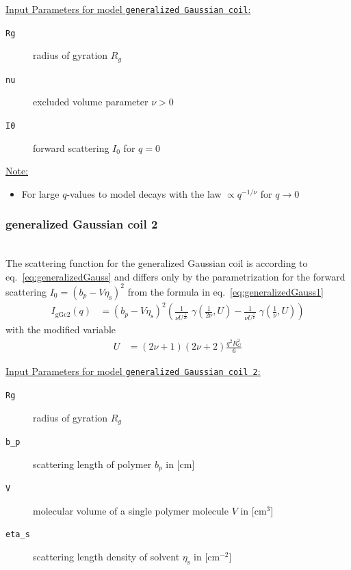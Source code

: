 \vspace{5mm}
\noindent \uline{Input Parameters for model \texttt{generalized Gaussian coil}:}
\begin{description}
\item[\texttt{Rg}] radius of gyration $R_g$
\item[\texttt{nu}] excluded volume parameter $\nu>0$
\item[\texttt{I0}] forward scattering $I_0$ for $q=0$
\end{description}
\vspace{5mm}

\noindent \uline{Note:}
\begin{itemize}
\item For large $q$-values to model decays with the law $\propto q^{-1/\nu}$ for $q \rightarrow 0$
\end{itemize}
\vspace{5mm}

\subsubsection{generalized Gaussian coil 2} \cite{Hammouda,Hammouda2012}
\label{sect:generalized_gaussian_coil2}
~\\
The scattering function for the generalized Gaussian coil is according to eq.\ \ref{eq:generalizedGauss}
and differs only by the parametrization for the forward scattering
$I_0=(b_p-V\eta_\text{s})^2$ from the formula in eq.\ \ref{eq:generalizedGauss1}
\begin{align}
I_\text{gGc2}(q) &= \left(b_p-V\eta_\text{s}\right)^2
\left(
\frac{1}{\nu U^{\frac{1}{2 \nu}}} \; \gamma\left(\frac{1}{2 \nu},U\right)-
\frac{1}{\nu U^{\frac{1}{  \nu}}} \; \gamma\left(\frac{1}{  \nu},U\right)
\right)
\label{eq:generalizedGauss2}
\end{align}
with the modified variable
\begin{align}
U&= \left(2\nu+1\right)\left(2\nu+2\right)\frac{q^2R_G^2}{6}
\end{align}

\vspace{5mm}
\noindent \uline{Input Parameters for model \texttt{generalized Gaussian coil 2}:}
\begin{description}
\item[\texttt{Rg}] radius of gyration $R_g$
\item[\texttt{b\_p}] scattering length of polymer $b_p$ in [cm]
\item[\texttt{V}] molecular volume of a single polymer molecule $V$ in [cm$^3$]
\item[\texttt{eta\_s}] scattering length density of solvent $\eta_\text{s}$ in [cm$^{-2}$]
\end{description}
\vspace{5mm}

